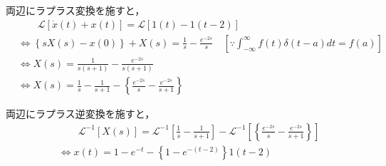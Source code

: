 \documentclass[a4paper,12pt]{article}
\begin{document}
\begin{tcolorbox}[title={3.(2) \( \dot{x}(t)+ x(t)= 1(t)- 1(t-2) \)
    }]
    \quad 両辺にラプラス変換を施すと，
    \vspace{-3mm}
    \begin{align*}
        &\qquad \mathcal{L}\left[ \dot{x}(t)+ x(t) \right] 
        = \mathcal{L} \left[ 1(t)- 1(t-2) \right] \\
        &\Leftrightarrow \left\{ sX(s) - x(0) \right\} + X(s) 
        = \frac{1}{s} - \frac{e^{-2s}}{s} \quad 
        \left[\because \int_{-\infty}^{\infty} f(t)\delta(t-a) dt = f(a)\right]\\
        &\Leftrightarrow X(s) = \frac{1}{s(s+1)} - \frac{e^{-2s}}{s(s+1)}  \\
        &\Leftrightarrow X(s) = \frac{1}{s} - \frac{1}{s+1} 
        - \left\{ \frac{e^{-2s}}{s} - \frac{e^{-2s}}{s+1} \right\} 
    \end{align*}
        
    \quad 両辺にラプラス逆変換を施すと，
    \vspace{-3mm}
    \begin{align*}
    &\qquad \mathcal{L}^{-1} \left[ X(s) \right] 
    = \mathcal{L}^{-1} \left[ \frac{1}{s} - \frac{1}{s+1}   \right] 
    - \mathcal{L}^{-1} \left[ \left\{ \frac{e^{-2s}}{s} - \frac{e^{-2s}}{s+1} \right\}  \right] \\
    &\Leftrightarrow x(t) = 1-e^{-t} - \left\{1-e^{-(t-2)}\right\} 1(t-2)
    \end{align*}
\end{tcolorbox}
\end{document}

